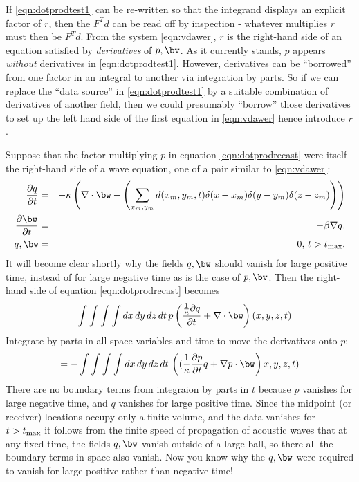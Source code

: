 If \ref{eqn:dotprodtest1} can be re-written so that the integrand displays an explicit factor of $r$, then the $F^Td$ can be read off by inspection - whatever multiplies $r$ must then be $F^Td$. From the system \ref{eqn:vdawer}, $r$ is the right-hand side of an equation satisfied by {\em derivatives} of $p, \bv$. As it currently stands, $p$ appears {\em without} derivatives in \ref{eqn:dotprodtest1}. However, derivatives can be ``borrowed'' from one factor in an integral to another via integration by parts. So if we can replace the ``data source'' in \ref{eqn:dotprodtest1} by a suitable combination of derivatives of another field, then we could presumably ``borrow'' those derivatives to set up the left hand side of the first equation in \ref{eqn:vdawer} hence introduce $r$. 

Suppose that the factor multiplying $p$ in equation \ref{eqn:dotprodrecast} were itself the right-hand side of a wave equation, one of a pair similar to \ref{eqn:vdawer}:
\begin{eqnarray}
\label{eqn:vdaweadj}
\frac{\partial q}{\partial t}& = &-\kappa\left(\nabla \cdot \bw - \left(\sum_{x_m,y_m}d(x_m,y_m,t) \delta(x-x_m)\delta(y-y_m)\delta(z-z_m)\right)\right)\nonumber \\
\frac{\partial \bw}{\partial t} & = & -\beta \nabla q,\nonumber \\
q, \bw & = & 0, \, t > t_{\rm max}. 
\end{eqnarray}
It will become clear shortly why the fields $q, \bw$ should vanish for large positive time, instead of for large negative time as is the case of $p, \bv$. Then the right-hand side of equation \ref{eqn:dotprodrecast} becomes
\[
= \int \int \int \int dx\,dy\,dz\,dt\, p\left(\frac{\frac{1}{\kappa}\partial q}{\partial t}+\nabla \cdot \bw  \right)(x,y,z,t) 
\]
Integrate by parts in all space variables and time to move the derivatives onto $p$:
\[
= -\int \int \int \int dx\,dy\,dz\,dt\, \left((\frac{1}{\kappa}\frac{\partial p}{\partial t}q+\nabla p \cdot \bw  \right)x,y,z,t) 
\]
There are no boundary terms from integraion by parts in $t$ because $p$ vanishes for large negative time, and $q$ vanishes for large positive time. Since the midpoint (or receiver) locations occupy only a finite volume, and the data vanishes for $t>t_{\rm max}$ it follows from the finite speed of propagation of acoustic waves that at any fixed time, the fields $q, \bw$ vanish outside of a large ball, so there all the boundary terms in space also vanish. Now you know why the $q,\bw$ were required to vanish for large positive rather than negative time!

